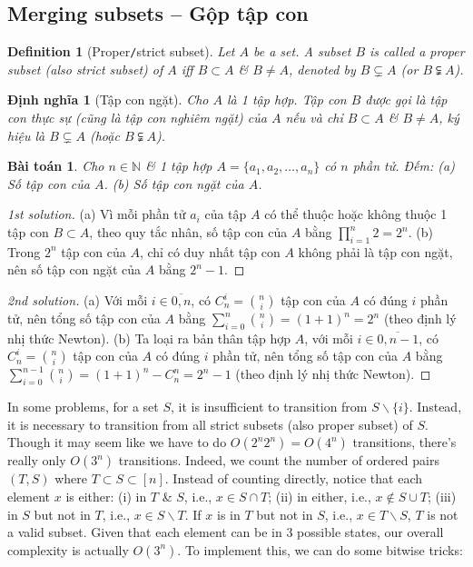 \documentclass{article}
\newtheorem{baitoan}{Bài toán}
\newtheorem{definition}{Definition}
\newtheorem{dinhnghia}{Định nghĩa}
\begin{document}

\subsection{Merging subsets -- Gộp tập con}

\begin{definition}[Proper{\tt/}strict subset]
    Let $A$ be a set. A subset $B$ is called a {\rm proper subset} (also {\rm strict subset}) of $A$ iff $B\subset A$ \& $B\ne A$, denoted by $B\subsetneq A$ (or $B\subsetneqq A$).
\end{definition}

\begin{dinhnghia}[Tập con ngặt]
    Cho $A$ là 1 tập hợp. Tập con $B$ được gọi là {\rm tập con thực sự} (cũng là {\rm tập con nghiêm ngặt}) của $A$ nếu và chỉ $B\subset A$ \& $B\ne A$, ký hiệu là $B\subsetneq A$ (hoặc $B\subsetneqq A$).
\end{dinhnghia}

\begin{baitoan}
    Cho $n\in\mathbb{N}$ \& 1 tập hợp $A = \{a_1,a_2,\ldots,a_n\}$ có $n$ phần tử. Đếm: (a) Số tập con của $A$. (b) Số tập con ngặt của $A$.
\end{baitoan}

\begin{proof}[1st solution]
    (a) Vì mỗi phần tử $a_i$ của tập $A$ có thể thuộc hoặc không thuộc 1 tập con $B\subset A$, theo quy tắc nhân, số tập con của $A$ bằng $\prod_{i=1}^n 2 = 2^n$. (b) Trong $2^n$ tập con của $A$, chỉ có duy nhất tập con $A$ không phải là tập con ngặt, nên số tập con ngặt của $A$ bằng $2^n - 1$.
\end{proof}

\begin{proof}[2nd solution]
    (a) Với mỗi $i\in\overline{0,n}$, có $C_n^i = \binom{n}{i}$ tập con của $A$ có đúng $i$ phần tử, nên tổng số tập con của $A$ bằng $\sum_{i=0}^n \binom{n}{i} = (1 + 1)^n = 2^n$ (theo định lý nhị thức Newton). (b) Ta loại ra bản thân tập hợp $A$, với mỗi $i\in\overline{0,n - 1}$, có $C_n^i = \binom{n}{i}$ tập con của $A$ có đúng $i$ phần tử, nên tổng số tập con của $A$ bằng $\sum_{i=0}^{n-1} \binom{n}{i} = (1 + 1)^n - C_n^n = 2^n - 1$ (theo định lý nhị thức Newton).
\end{proof}
In some problems, for a set $S$, it is insufficient to transition from $S\backslash\{i\}$. Instead, it is necessary to transition from all strict subsets (also proper subset) of $S$. Though it may seem like we have to do $O(2^n2^n) = O(4^n)$ transitions, there's really only $O(3^n)$ transitions. Indeed, we count the number of ordered pairs $(T,S)$ where $T\subset S\subset[n]$. Instead of counting directly, notice that each element $x$ is either: (i) in $T$ \& $S$, i.e., $x\in S\cap T$; (ii) in either, i.e., $x\notin S\cup T$; (iii) in $S$ but not in $T$, i.e., $x\in S\backslash T$. If $x$ is in $T$ but not in $S$, i.e., $x\in T\backslash S$, $T$ is not a valid subset. Given that each element can be in 3 possible states, our overall complexity is actually $O(3^n)$. To implement this, we can do some bitwise tricks:
\end{document}
